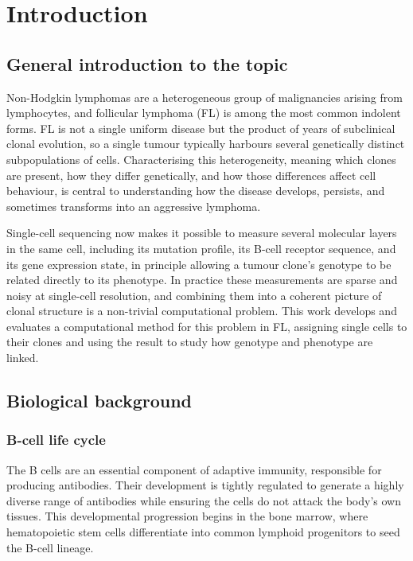 \chapter{Introduction}

\section{General introduction to the topic}

Non-Hodgkin lymphomas are a heterogeneous group of malignancies arising from lymphocytes, and follicular lymphoma (FL) is among the most common indolent forms.
FL is not a single uniform disease but the product of years of subclinical clonal evolution, so a single tumour typically harbours several genetically distinct subpopulations of cells.
Characterising this heterogeneity, meaning which clones are present, how they differ genetically, and how those differences affect cell behaviour, is central to understanding how the disease develops, persists, and sometimes transforms into an aggressive lymphoma.

Single-cell sequencing now makes it possible to measure several molecular layers in the same cell, including its mutation profile, its B-cell receptor sequence, and its gene expression state, in principle allowing a tumour clone's genotype to be related directly to its phenotype.
In practice these measurements are sparse and noisy at single-cell resolution, and combining them into a coherent picture of clonal structure is a non-trivial computational problem.
This work develops and evaluates a computational method for this problem in FL, assigning single cells to their clones and using the result to study how genotype and phenotype are linked.

\section{Biological background}

\subsection{B-cell life cycle}

The B cells are an essential component of adaptive immunity, responsible for producing antibodies. Their development is tightly regulated to generate a highly diverse range of antibodies while ensuring the cells do not attack the body's own tissues.
This developmental progression begins in the bone marrow, where hematopoietic stem cells differentiate into common lymphoid progenitors to seed the B-cell lineage.

